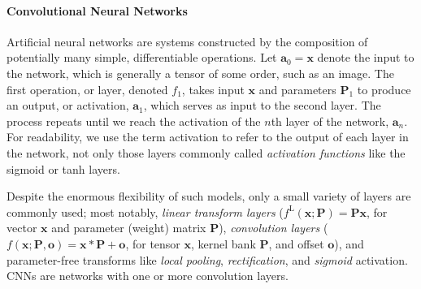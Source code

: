 \documentclass[10pt,twocolumn,letterpaper]{article}
\renewcommand{\vec}{\mathbf}
\newcommand{\x}{\vec{x}}
\renewcommand{\P}{\vec{P}}
\renewcommand{\a}{\vec{a}}
\renewcommand{\o}{\vec{o}}
\newcommand{\fL}{^{\text{L}}}
\begin{document}
\paragraph{Convolutional Neural Networks}

Artificial neural networks are systems constructed by the composition of potentially many simple, differentiable operations. Let $\a_0 = \x$ denote the input to the network, which is generally a tensor of some order, such as an image.  The first operation, or layer, denoted $f_1$, takes input $\x$ and parameters $\P_1$ to produce an output, or activation, $\a_1$, which serves as input to the second layer.  The process repeats until we reach the activation of the $n$th layer of the network, $\a_n$.  For readability, we use the term activation to refer to the output of each layer in the network, not only those layers commonly called \textit{activation functions} like the sigmoid or tanh layers.

Despite the enormous flexibility of such models, only a small variety of layers are commonly used; most notably, \textit{linear transform layers} ($f\fL(\x;\P)=\P\x$, for vector $\x$ and parameter (weight) matrix $\P$), \textit{convolution layers} ($f(\x;\P,\o)=\x*\P + \o$, for tensor $\x$, kernel bank $\P$, and offset $\o$), and parameter-free transforms like \textit{local pooling}, \textit{rectification}, and \textit{sigmoid} activation.
CNNs are networks with one or more convolution layers.
\end{document}
